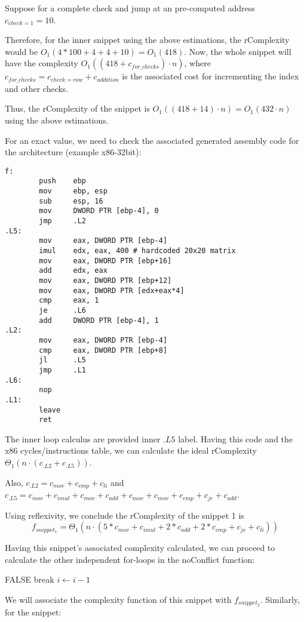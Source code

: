Suppose for a complete check and jump at an pre-computed address $c_{check=1} = 10$.

Therefore, for the inner snippet using the above estimations, the rComplexity would be $O_{1}(4 * 100 + 4 + 4 + 10) = O_{1}(418)$. Now, the whole snippet will have the complexity $O_{1}((418 + c_{for\_checks}) \cdot n)$, where  $c_{for\_checks} = c_{check=row} + c_{addition}$ is the associated cost for incrementing the index and other checks. 

Thus, the rComplexity of the snippet is $O_{1}((418 + 14) \cdot n) = O_{1}(432 \cdot n)$ using the above estimations.

 
For an exact value, we need to check the associated generated assembly code for the architecture (example x86-32bit):
\begin{verbatim}
f:
        push    ebp
        mov     ebp, esp
        sub     esp, 16
        mov     DWORD PTR [ebp-4], 0
        jmp     .L2
.L5:
        mov     eax, DWORD PTR [ebp-4]
        imul    edx, eax, 400 # hardcoded 20x20 matrix
        mov     eax, DWORD PTR [ebp+16]
        add     edx, eax
        mov     eax, DWORD PTR [ebp+12]
        mov     eax, DWORD PTR [edx+eax*4]
        cmp     eax, 1
        je      .L6
        add     DWORD PTR [ebp-4], 1
.L2:
        mov     eax, DWORD PTR [ebp-4]
        cmp     eax, DWORD PTR [ebp+8]
        jl      .L5
        jmp     .L1
.L6:
        nop
.L1:
        leave
        ret  
\end{verbatim}


The inner loop calculus are provided inner $.L5$ label. Having this code and the x86 cycles/instructions table, we can calculate the ideal rComplexity $\Theta_{1}(n \cdot (c_{.L2} + c_{.L5}))$. 

Also, $c_{.L2} = c_{mov} + c_{cmp} + c_{li}$ and $c_{.L5} = c_{mov} + c_{imul} + c_{mov} +  c_{add} + c_{mov} + c_{mov} + c_{cmp} + c_{je} + c_{add} $. 

Using reflexivity, we conclude the rComplexity of the snippet 1 is \[f_{snippet_{1}} =  \Theta_{1}(n \cdot ( 5 * c_{mov} + c_{imul} + 2 * c_{add} +2 *  c_{cmp} + c_{je} + c_{li}))\]

Having this snippet's associated complexity calculated, we can proceed to calculate the other independent for-loops in the noConflict function:
\begin{algorithmic}[1]
			\State \Return FALSE
		\EndIf
		\State break
	\EndIf
	\State $i \gets i-1$	
	\EndFor
\end{algorithmic}
We will associate the complexity function of this snippet with $f_{snippet_{2}}$. Similarly, for the snippet:

